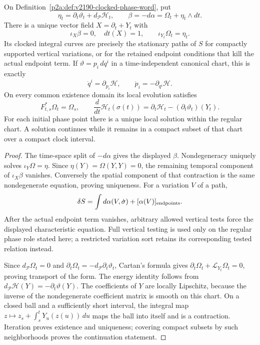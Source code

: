\documentclass[12pt,a4paper]{article}
\begin{document}
\begin{theorem}
\label{p2a:thm:v2190-clocked-characteristic}
On Definition~\ref{p2a:def:v2190-clocked-phase-word}, put
\[
 \eta_t=\partial_t\vartheta_t+d_{\mathcal P}\mathcal H_t,
 \qquad \beta=-d\alpha=\Omega_t+\eta_t\wedge dt.
\]
There is a unique vector field \(X=\partial_t+Y_t\) with
\[
 \boxed{\iota_X\beta=0,\quad dt(X)=1,
 \qquad \iota_{Y_t}\Omega_t=\eta_t.}
\]
Its clocked integral curves are precisely the stationary paths of \(S\)
for compactly supported vertical variations, or for the retained endpoint
conditions that kill the actual endpoint term.  If \(\vartheta=p_i\,dq^i\)
in a time-independent canonical chart, this is exactly
\[
 \dot q^i=\partial_{p_i}\mathcal H,
 \qquad \dot p_i=-\partial_{q^i}\mathcal H.
\]
On every common existence domain its local evolution satisfies
\[
 F_{t,s}^{*}\Omega_t=\Omega_s,
 \qquad
 \frac{d}{dt}\mathcal H_t(\sigma(t))
 =\partial_t\mathcal H_t-(\partial_t\vartheta_t)(Y_t).
\]
For each initial phase point there is a unique local solution within the
regular chart.  A solution continues while it remains in a compact subset
of that chart over a compact clock interval.
\end{theorem}
\begin{proof}
The time-space split of \(-d\alpha\) gives the displayed \(\beta\).
Nondegeneracy uniquely solves \(\iota_Y\Omega=\eta\).
Since \(\eta(Y)=\Omega(Y,Y)=0\), the remaining temporal component of
\(\iota_X\beta\) vanishes.  Conversely the spatial component of that
contraction is the same nondegenerate equation, proving uniqueness.
For a variation \(V\) of a path,
\[
 \delta S=\int d\alpha(V,\dot\sigma)
               +[\alpha(V)]_{\rm endpoints}.
\]
After the actual endpoint term vanishes, arbitrary allowed vertical tests
force the displayed characteristic equation.  Full vertical testing is
used only on the regular phase role stated here; a restricted variation
sort retains its corresponding tested relation instead.

Since \(d_{\mathcal P}\Omega_t=0\) and
\(\partial_t\Omega_t=-d_{\mathcal P}\partial_t\vartheta_t\), Cartan's formula
gives \(\partial_t\Omega_t+\mathcal L_{Y_t}\Omega_t=0\), proving transport
of the form.  The energy identity follows from
\(d_{\mathcal P}\mathcal H(Y)=-\partial_t\vartheta(Y)\).
The coefficients of \(Y\) are locally Lipschitz, because the inverse of
the nondegenerate coefficient matrix is smooth on this chart.  On a closed
ball and a sufficiently short interval, the integral map
\(z\mapsto z_s+\int_s^tY_u(z(u))\,du\) maps the ball into itself and is a
contraction.  Iteration proves existence and uniqueness; covering compact
subsets by such neighborhoods proves the continuation statement.
\end{proof}
\end{document}
